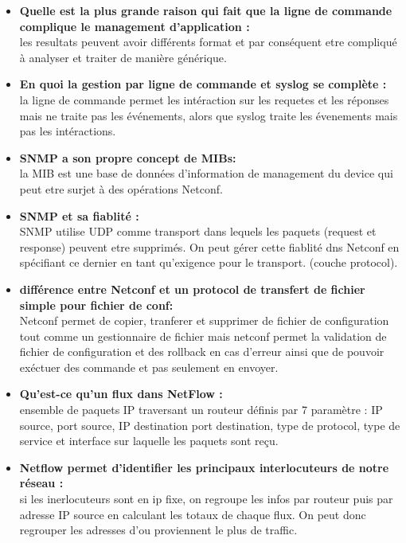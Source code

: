 \documentclass[12pt,landscape]{article}
\begin{document}
\begin{multicols}{2}
\begin{enumerate}
\begin{itemize}
 \item \textbf{Quelle est la plus grande raison qui fait que la ligne de commande complique le management d'application :}\\
 les resultats peuvent avoir différents format et par conséquent etre compliqué à analyser et traiter de manière générique.
 
 \item \textbf{En quoi la gestion par ligne de commande et syslog se complète :}\\
 la ligne de commande permet les intéraction sur les requetes et les réponses mais ne traite pas les événements, alors que syslog traite les évenements mais pas les intéractions.
 
 \item \textbf{SNMP a son propre concept de MIBs: }\\
 la MIB est une base de données d'information de management du device qui peut etre surjet à des opérations Netconf.
 
 \item \textbf{SNMP et sa fiablité : }\\
 SNMP utilise UDP comme transport dans lequels les paquets (request et response) peuvent etre supprimés. On peut gérer cette fiablité dns Netconf en spécifiant ce dernier en tant qu'exigence pour le transport. (couche protocol).
 
 \item \textbf{différence entre Netconf et un protocol de transfert de fichier simple pour fichier de conf:}\\
 Netconf permet de copier, tranferer et supprimer de fichier de configuration tout comme un gestionnaire de fichier mais netconf permet la validation de fichier de configuration et des rollback en cas d'erreur ainsi que de pouvoir exéctuer des commande et pas seulement en envoyer.
 
 \item \textbf{Qu'est-ce qu'un flux dans NetFlow : }\\
 ensemble de paquets IP traversant un routeur définis par 7 paramètre : IP source, port source, IP destination port destination, type de protocol, type de service et interface sur laquelle les paquets sont reçu.
 
 \item \textbf{Netflow permet d'identifier les principaux interlocuteurs de notre réseau : }\\
 si les inerlocuteurs sont en ip fixe, on regroupe les infos par routeur puis par adresse IP source en calculant les totaux de chaque flux. On peut donc regrouper les adresses d'ou proviennent le plus de traffic.
\end{itemize}

\end{enumerate}




\end{multicols}
\end{document}
